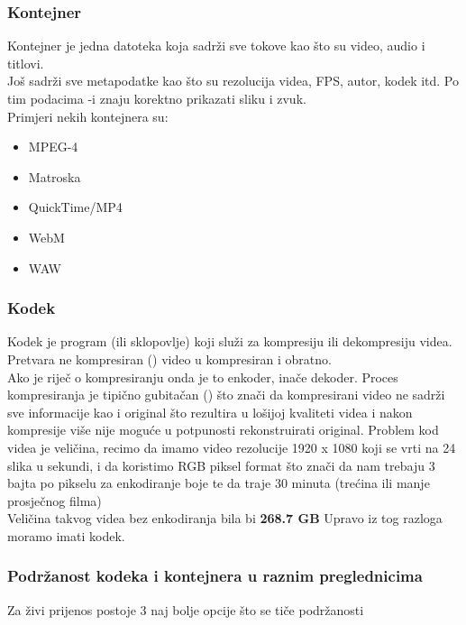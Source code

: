 \subsubsection{Kontejner} \label{sec:container}
Kontejner je jedna datoteka koja sadrži sve tokove kao što su video, audio i titlovi.\\
Još sadrži sve metapodatke kao što su rezolucija videa, FPS, autor, kodek itd. Po tim 
podacima \hyperref[sct:videoPlayer]{}-i znaju korektno prikazati sliku i zvuk. \cite{ffmpegBook}
\\
Primjeri nekih kontejnera su:
\begin{itemize}
  \item MPEG-4
  \item Matroska
  \item QuickTime/MP4
  \item WebM
  \item WAW
\end{itemize}

\subsubsection{Kodek} \label{sec:codec}
Kodek je program (ili sklopovlje) koji služi za kompresiju ili dekompresiju videa. \\
Pretvara ne kompresiran () video u kompresiran i obratno. \\
Ako je riječ o kompresiranju onda je to enkoder, inače dekoder. \cite{ffmpegBook}
\paraBreak
Proces kompresiranja je tipično gubitačan () što znači da kompresirani video ne sadrži sve informacije kao i original
što rezultira u lošijoj kvaliteti videa i nakon kompresije više nije moguće u potpunosti rekonstruirati original. \cite{ffmpegBook}
\paraBreak
Problem kod videa je veličina, recimo da imamo video rezolucije 1920 x 1080 koji se vrti na 24 slika u sekundi, i da 
koristimo RGB piksel format što znači da nam trebaju 3 bajta po pikselu za enkodiranje boje te da traje 30 minuta 
(trećina ili manje prosječnog filma) \\
Veličina takvog videa bez enkodiranja bila bi \textbf{268.7 GB} \label{sec:size_problem} \cite{ffmpegBook}
\paraBreak
Upravo iz tog razloga moramo imati kodek.

\subsubsection{Podržanost kodeka i kontejnera u raznim preglednicima}
Za živi prijenos postoje 3 naj bolje opcije što se tiče podržanosti \cite{appleCodec} \cite{androidCodec} \cite{canIUse}

